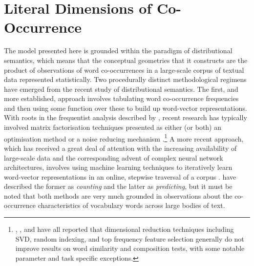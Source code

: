 \section{Literal Dimensions of Co-Occurrence} \label{sec:litdims}
The model presented here is grounded within the paradigm of distributional semantics, which means that the conceptual geometries that it constructs are the product of observations of word co-occurrences in a large-scale corpus of textual data represented statistically.  Two procedurally distinct methodological regimens have emerged from the recent study of distributional semantics.  The first, and more established, approach involves tabulating word co-occurrence frequencies and then using some function over these to build up word-vector representations.  With roots in the frequentist analysis described by \cite{SaltonEA1975}, recent research has typically involved matrix factorisation techniques presented as either (or both) an optimisation method \citep{BullinariaEA2012} or a noise reducing mechanism \citep{KielaEA2014}.\footnote{\cite{BullinariaEA2012}, \cite{LapesaEA2013}, and \cite{KielaEA2014} have all reported that dimensional reduction techniques including SVD, random indexing, and top frequency feature selection generally do not improve results on word similarity and composition tests, with some notable parameter and task specific exceptions.}  A more recent approach, which has received a great deal of attention with the increasing availability of large-scale data and the corresponding advent of complex neural network architectures, involves using machine learning techniques to iteratively learn word-vector representations in an online, stepwise traversal of a corpus \citep{BengioEA2003,CollobertEA2008,KalchbrennerEA2014}.  \cite{BaroniEA2014} have described the former as \emph{counting} and the latter as \emph{predicting}, but it must be noted that both methods are very much grounded in observations about the co-occurrence characteristics of vocabulary words across large bodies of text.

